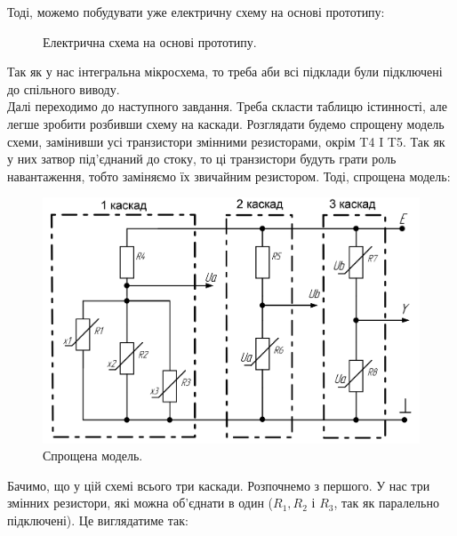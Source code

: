 \documentclass[a4paper,14pt]{extreport}
\begin{document}
Тоді, можемо побудувати уже електричну схему на основі прототипу:
\begin{figure}[h!]
\caption{Електрична схема на основі прототипу.}
\label{ris2}
\end{figure}
Так як у нас інтегральна мікросхема, то треба аби всі підклади були підключені до спільного виводу.\\
\newpage
Далі переходимо до наступного завдання. Треба скласти таблицю істинності, але легше зробити розбивши схему на каскади. Розглядати будемо спрощену модель схеми, замінивши усі транзистори змінними резисторами, окрім T4 I T5. Так як у них затвор під’єднаний до стоку, то ці транзистори будуть грати роль навантаження, тобто заміняємо їх звичайним резистором. Тоді, спрощена модель:
\begin{figure}[h!]
	\begin{center}\includegraphics[width=0.7\linewidth]{3.png}\end{center}
	\caption{Спрощена модель.}
	\label{ris3}
\end{figure}


Бачимо, що у цій схемі всього три каскади. Розпочнемо з першого. У нас три змінних резистори, які можна об’єднати в один ($R_1, R_2$ і $R_3$, так як паралельно підключені). Це виглядатиме так:
\begin{figure}[h!]
	\label{ris4}
\end{figure}
\end{document}
